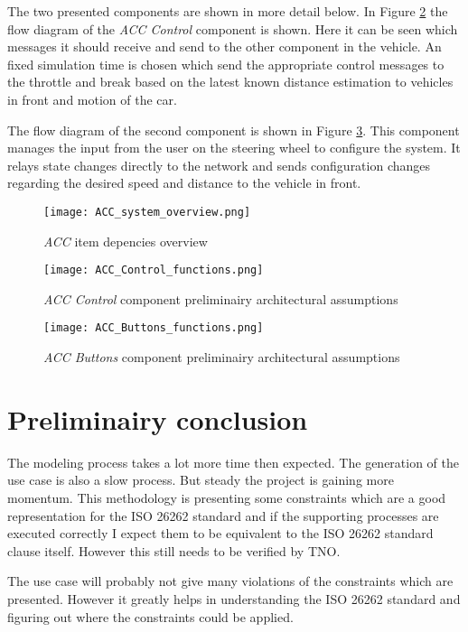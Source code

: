 \documentclass[a4paper]{article}
\newcommand{\ISO}{ISO 26262 standard\xspace}
\begin{document}
The two presented components are shown in more detail below.
In Figure \ref{fig:ACC Control component} the flow diagram of the \textit{ACC Control} component is shown.
Here it can be seen which messages it should receive and send to the other component in the vehicle.
An fixed simulation time is chosen which send the appropriate control messages to the throttle and break based on the latest known distance estimation to vehicles in front and motion of the car.

The flow diagram of the second component is shown in Figure \ref{fig:ACC Buttons}.
This component manages the input from the user on the steering wheel to configure the system.
It relays state changes directly to the network and sends configuration changes regarding the desired speed and distance to the vehicle in front.

\begin{figure}[h!]\centering
	\texttt{[image: ACC\_system\_overview.png]}
	\caption{\textit{ACC} item depencies overview}  \label{fig:ACC system overview}
\end{figure}
\begin{figure}[h!]\centering
	\texttt{[image: ACC\_Control\_functions.png]}
	\caption{\textit{ACC Control} component preliminairy architectural assumptions}  \label{fig:ACC Control component}
\end{figure}
\begin{figure}[h!]\centering
	\texttt{[image: ACC\_Buttons\_functions.png]}
	\caption{\textit{ACC Buttons} component preliminairy architectural assumptions}  \label{fig:ACC Buttons}
\end{figure}

\section{Preliminairy conclusion} \label{sec:conclusion}
The modeling process takes a lot more time then expected.
The generation of the use case is also a slow process.
But steady the project is gaining more momentum.
This methodology is presenting some constraints which are a good representation for the \ISO and if the supporting processes are executed correctly I expect them to be equivalent to the \ISO clause itself.
However this still needs to be verified by TNO.

The use case will probably not give many violations of the constraints which are presented.
However it greatly helps in understanding the \ISO and figuring out where the constraints could be applied.
\end{document}
